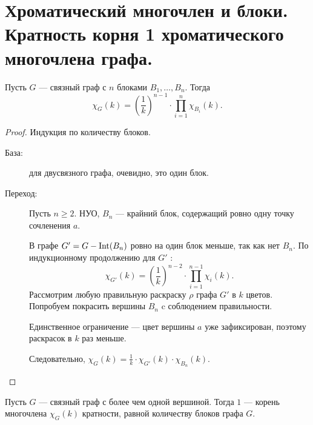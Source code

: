 \section{Хроматический многочлен и блоки. Кратность корня 1 хроматического многочлена графа.}

\begin{lemma}\label{lm:coloring_14}
    Пусть $G$ --- связный граф с $n$ блоками $B_1, \ldots , B_n$. Тогда 
	\[
	\chi_G(k) = \left( \frac{1}{k} \right) ^{n-1} \cdot \prod_{i=1}^{n} \chi_{B_i} (k)
	.\] 
\end{lemma}
\begin{proof}
    Индукция по количеству блоков.
	\begin{description}
		\item[База:] для двусвязного графа, очевидно, это один блок.
		\item[Переход:] Пусть $n \ge 2$. НУО, $B_n$ --- крайний блок, содержащий ровно одну точку сочленения $a$.

			В графе $G' = G - \operatorname{Int}(B_n)$ ровно на один блок меньше, так как нет $B_n$. По индукционному продолжению для $G'$ :
			\[
			\chi_{G'}(k) = \left( \frac{1}{k} \right) ^{n-2} \cdot \prod_{i=1}^{n-1} \chi_{i}(k)
			.\] 
			Рассмотрим любую правильную раскраску $\rho$ графа $G'$ в $k$ цветов. Попробуем покрасить вершины $B_n$ c соблюдением правильности.

			Единственное ограничение --- цвет вершины $a$ уже зафиксирован, поэтому раскрасок в $k$ раз меньше.

			Следовательно, $\chi_G(k) = \frac{1}{k} \cdot  \chi_{G'}(k) \cdot \chi_{B_n}(k)$.
	\end{description}
\end{proof}
\begin{theorem}
    Пусть  $G$ --- связный граф с более чем одной вершиной. Тогда $1$ --- корень многочлена $\chi_G(k)$ кратности, равной количеству блоков графа $G$.
\end{theorem}
